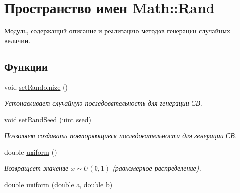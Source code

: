 \hypertarget{namespace_math_1_1_rand}{}\section{Пространство имен Math\+:\+:Rand}
\label{namespace_math_1_1_rand}


Модуль, содержащий описание и реализацию методов генерации случайных величин.  


\subsection*{Функции}
\begin{DoxyCompactItemize}
\item 
\hypertarget{namespace_math_1_1_rand_a9453617916a97c982c22f2b020a42e47}{}\label{namespace_math_1_1_rand_a9453617916a97c982c22f2b020a42e47} 
void \hyperlink{namespace_math_1_1_rand_a9453617916a97c982c22f2b020a42e47}{set\+Randomize} ()
\begin{DoxyCompactList}\small\item\em Устонавливает случайную последовательность для генерации СВ. \end{DoxyCompactList}\item 
\hypertarget{namespace_math_1_1_rand_adb05648d372d8a1d62395ce68feca0fa}{}\label{namespace_math_1_1_rand_adb05648d372d8a1d62395ce68feca0fa} 
void \hyperlink{namespace_math_1_1_rand_adb05648d372d8a1d62395ce68feca0fa}{set\+Rand\+Seed} (uint seed)
\begin{DoxyCompactList}\small\item\em Позволяет создавать повторяющиеся последовательности для генерации СВ. \end{DoxyCompactList}\item 
\hypertarget{namespace_math_1_1_rand_aeabcc694147b60b153e8a1ef0db2d845}{}\label{namespace_math_1_1_rand_aeabcc694147b60b153e8a1ef0db2d845} 
double \hyperlink{namespace_math_1_1_rand_aeabcc694147b60b153e8a1ef0db2d845}{uniform} ()
\begin{DoxyCompactList}\small\item\em Возвращает значение $ x \sim U(0,1)$ (равномерное распределение). \end{DoxyCompactList}\item 
\hypertarget{namespace_math_1_1_rand_afca61ab1c61ad2c5432521716de9e646}{}\label{namespace_math_1_1_rand_afca61ab1c61ad2c5432521716de9e646} 
double \hyperlink{namespace_math_1_1_rand_afca61ab1c61ad2c5432521716de9e646}{uniform} (double a, double b)

\end{DoxyCompactItemize}
